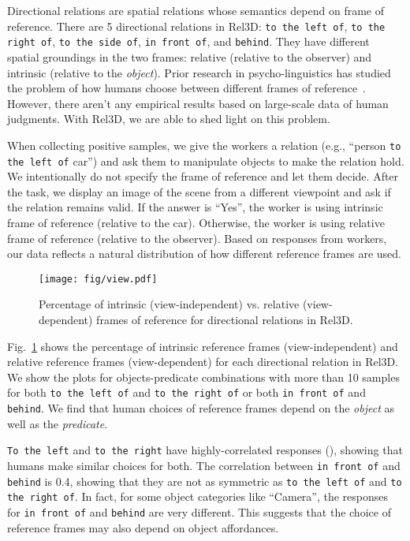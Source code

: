 \documentclass{article}
\newcommand{\smallsec}[1]{\noindent {\bf #1.}}
\newcommand\datasetname{Rel3D}
\begin{document}
\smallsec{Directional spatial relations}
\label{projective_preposition}
Directional relations are spatial relations whose semantics depend on frame of reference. There are 5 directional relations in {\datasetname }: \texttt{to the left of}, \texttt{to the right of}, \texttt{to the side of}, \texttt{in front of}, and \texttt{behind}. They have different spatial groundings in the two frames: relative (relative to the observer) and intrinsic (relative to the \emph{object}). Prior research in psycho-linguistics has studied the problem of how humans choose between different frames of reference~\cite{garnham1989unified,gapp1995angle,jackendoff1996architecture,coventry2004saying}. However, there aren't any empirical results based on large-scale data of human judgments. With {\datasetname }, we are able to shed light on this problem.

When collecting positive samples, we give the workers a relation (e.g., ``person \texttt{to the left of} car'') and ask them to manipulate objects to make the relation hold. We intentionally do not specify the frame of reference and let them decide. After the task, we display an image of the scene from a different viewpoint and ask if the relation remains valid. If the answer is ``Yes'', the worker is using intrinsic frame of reference (relative to the car). Otherwise, the worker is using relative frame of reference (relative to the observer). Based on responses from workers, our data reflects a natural distribution of how different reference frames are used.
\begin{figure}
\centering
\vspace{-2mm}
\texttt{[image: fig/view.pdf]}
\caption{Percentage of intrinsic (view-independent) vs. relative (view-dependent) frames of reference for directional relations in \datasetname.\vspace{-1.5em}}
\label{fig:direc}
\vspace{-4mm}
\end{figure}
Fig.~\ref{fig:direc} shows the percentage of intrinsic reference frames (view-independent) and relative reference frames (view-dependent) for each directional relation in {\datasetname }. We show the plots for objects-predicate combinations with more than 10 samples for both \texttt{to the left of} and \texttt{to the right of} or both \texttt{in front of} and \texttt{behind}. We find that human choices of reference frames depend on the \emph{object} as well as the \emph{predicate}. 

\texttt{To the left} and \texttt{to the right} have highly-correlated responses (), showing that humans make similar choices for both. The correlation between \texttt{in front of} and \texttt{behind} is 0.4, showing that they are not as symmetric as \texttt{to the left of} and \texttt{to the right of}. In fact, for some object categories like ``Camera'', the responses for \texttt{in front of} and \texttt{behind} are very different. This suggests that the choice of reference frames may also depend on object affordances.
\end{document}
